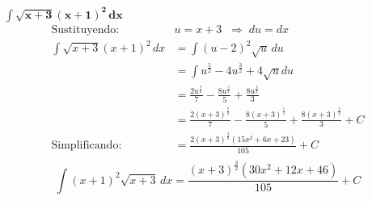 $\displaystyle \mathbf{ \int 
       \sqrt{x + 3} \left(x + 1\right)^{2} 
    \,dx}$ 
\nopagebreak
\begin{align*}
\text{Sustituyendo: } &u = x + 3 
\;\;\Rightarrow\; du = dx \\[6pt]
\int \sqrt{x + 3} \left(x + 1\right)^{2} \,dx
&= \int \left(u - 2\right)^{2} \sqrt{u} \, du \\[6pt]
&= \int u^{\frac{5}{2}} - 4u^{\frac{3}{2}} + 4 \sqrt{u}du\\[6pt]
&= \frac{2u^{\frac{7}{2}}}{7} - \frac{8u^{\frac{5}{2}}}{5} + \frac{8u^{\frac{3}{2}}}{3}\\[6pt]
&= \frac{2 \left(x + 3\right)^{\frac{7}{2}}}{7}
- \frac{8 \left(x + 3\right)^{\frac{5}{2}}}{5} 
+ \frac{8 \left(x + 3\right)^{\frac{3}{2}}}{3} + C\\[6pt]
\text{Simplificando: }&= \frac{2 \left(x + 3\right)^{\frac{3}{2}} \left(15x^{2} + 6x + 23\right)}{105} + C\\[6pt]
\end{align*}
\[
\boxed{\displaystyle 
\int \left(x + 1\right)^{2} \sqrt{x + 3}\,dx 
= \frac{\left(x + 3\right)^{\frac{3}{2}} \left(30x^{2} + 12x + 46\right)}{105} + C
}
\]